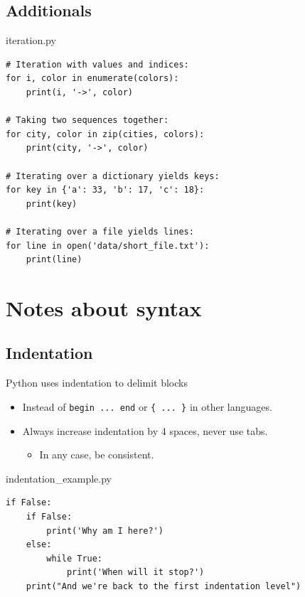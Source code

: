 \documentclass[aspectratio=1610,slidestop]{beamer}
\begin{document}
\subsection{Additionals}
\begin{pframe}
 \begin{pythonfile}{iteration.py}
  \begin{verbatim}
# Iteration with values and indices:
for i, color in enumerate(colors):
    print(i, '->', color)

# Taking two sequences together:
for city, color in zip(cities, colors):
    print(city, '->', color)

# Iterating over a dictionary yields keys:
for key in {'a': 33, 'b': 17, 'c': 18}:
    print(key)

# Iterating over a file yields lines:
for line in open('data/short_file.txt'):
    print(line)
  \end{verbatim}
 \end{pythonfile}
\end{pframe}



\section{Notes about syntax}

\subsection{Indentation}
\begin{pframe}
 Python uses indentation to delimit blocks
 \begin{itemize}
   \item Instead of \texttt{begin ... end} or \texttt{\{ ... \}} in other languages.
   \item Always increase indentation by 4 spaces, never use tabs.
   \begin{itemize}
     \item In any case, be consistent.
   \end{itemize}
 \end{itemize}
 \begin{pythonfile}{indentation\_example.py}
  \begin{verbatim}
if False:
    if False:
        print('Why am I here?')
    else:
        while True:
            print('When will it stop?')
    print("And we're back to the first indentation level")
  \end{verbatim}
 \end{pythonfile}
\end{pframe}
\end{document}
